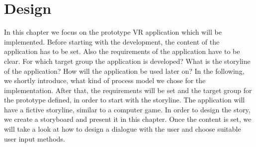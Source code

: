 \chapter{Design} \label{design}
In this chapter we focus on the prototype VR application which will be implemented. Before starting with the development, the content of the  application has to be set. Also the requirements of the application have to be clear. For which target group the application is developed? What is the storyline of the application? How will the application be used later on? In the following, we shortly introduce, what kind of process model we chose for the implementation. After that, the requirements will be set and the target group for the prototype defined, in order to start with the storyline. The application will have a fictive storyline, similar to a computer game. In order to design the story, we create a storyboard and present it in this chapter. Once the content is set, we will take a look at how to design a dialogue with the user and choose suitable user input methods.
